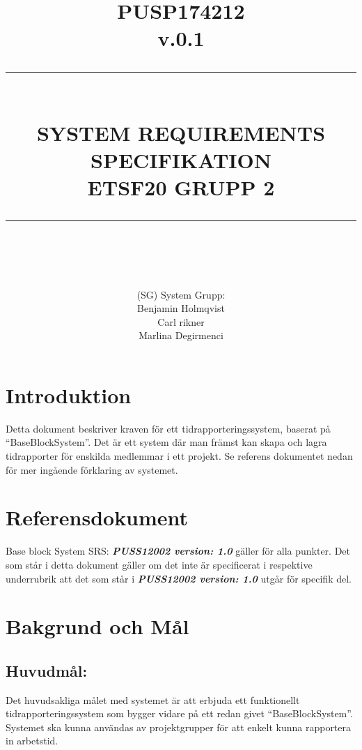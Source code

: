 \documentclass[paper=a4, fontsize=11pt,twoside]{article}
\title{ 														%
		\documentNumber{#1}											%
		\documentVersion{#2}											%
		\HRule{0.5pt} \\ %
		\LARGE \textbf{\uppercase{#3}} \\  									%
		\large \textbf{\uppercase{ETSF20 Grupp 2}}							%
		\HRule{2pt} \\ [0.5cm]      	%
		\normalsize          		%
	}															%
\author{#4}													%
\date{}                                           	%
\newcommand{\HRule}[1]{\rule{\linewidth}{#1}}   							%
\newcommand{\documentNumber}[1]{\centering PUSP1742#1 \\[1.0cm]}	 		%
\newcommand{\documentVersion}[1]{\centering \small{v.#1} \\[1.0cm]}	 		%
\newcommand{\grouptitlepage}[4]{										%
	\title{ 														%
		\documentNumber{#1}											%
		\documentVersion{#2}											%
		\HRule{0.5pt} \\ %
		\LARGE \textbf{\uppercase{#3}} \\  									%
		\large \textbf{\uppercase{ETSF20 Grupp 2}}							%
		\HRule{2pt} \\ [0.5cm]      	%
		\normalsize          		%
	}															%
	\author{#4}													%
	\maketitle														%
	\tableofcontents												%
	\thispagestyle{empty} 											%
	\newpage														%
}																%
\begin{document}
	
	\grouptitlepage
	{12	}
	{0.1}
	{System Requirements Specifikation}
	{(SG) System Grupp: \\ Benjamin Holmqvist \\ Carl rikner \\Marlina Degirmenci}	
	\section{Introduktion}
	Detta dokument beskriver kraven för ett tidrapporteringssystem, baserat på “BaseBlockSystem”. Det är ett system där man främst kan skapa och lagra tidrapporter för enskilda medlemmar i ett projekt. Se referens dokumentet nedan för mer ingående förklaring av systemet.
	\section{Referensdokument}
	Base block System SRS: \textbf{\textit{PUSS12002 version: 1.0}}  gäller för alla punkter. Det som står i detta dokument gäller om det inte är specificerat i respektive underrubrik att det som står i \textbf{\textit{PUSS12002 version: 1.0}}  utgår för specifik del.
	
	\section{Bakgrund och Mål}
	
	\subsection{Huvudmål:}
	Det huvudsakliga målet med systemet är att erbjuda ett funktionellt tidrapporteringssystem som bygger vidare på ett redan givet “BaseBlockSystem”. Systemet ska kunna användas av projektgrupper för att enkelt kunna rapportera in arbetstid.
\end{document}
